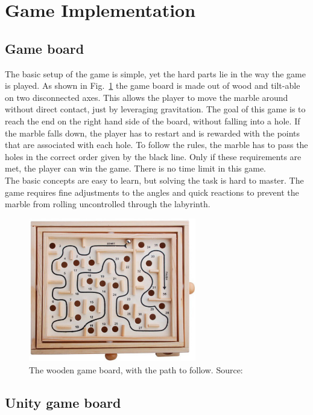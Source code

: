 
\section{Game Implementation}\label{sec:game-implementation}

\subsection{Game board}\label{subsec:game-board}
The basic setup of the game is simple, yet the hard parts lie in the way the game is played.
As shown in Fig.~\ref{fig:wooden_board} the game board is made out of wood and tilt-able on two disconnected axes.
This allows the player to move the marble around without direct contact, just by leveraging gravitation.
The goal of this game is to reach the end on the right hand side of the board, without falling into a hole.
If the marble falls down, the player has to restart and is rewarded with the points that are associated with each hole.
To follow the rules, the marble has to pass the holes in the correct order given by the black line.
Only if these requirements are met, the player can win the game.
There is no time limit in this game.\\
The basic concepts are easy to learn, but solving the task is hard to master.
The game requires fine adjustments to the angles and quick reactions to prevent the marble from rolling uncontrolled through
the labyrinth.

\begin{figure}[h]
    \centering
    \includegraphics[width=0.65\textwidth]{images/wooden_game_board}
    \caption{The wooden game board, with the path to follow. Source:~\cite{wooden_board}}
    \label{fig:wooden_board}
\end{figure}

\subsection{Unity game board}\label{subsec:unity-game-board}
